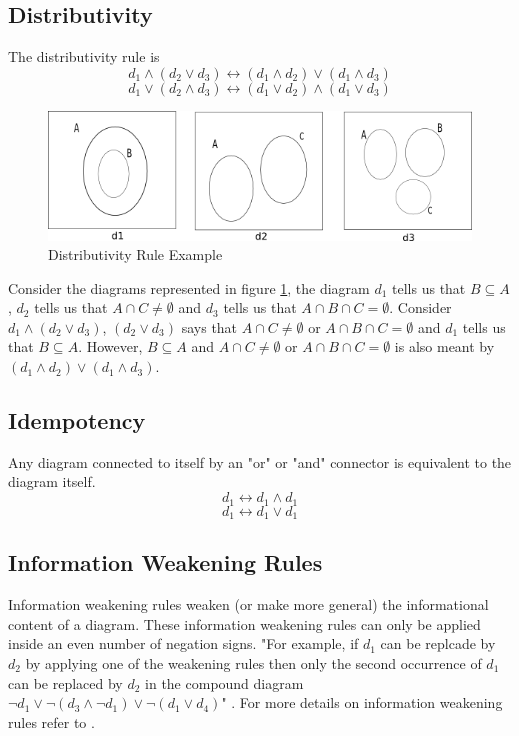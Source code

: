 \documentclass[10pt, a4paper, titlepage]{article}
\begin{document}
\subsection{Distributivity}
The distributivity rule is
$$ d_{1} \wedge (d_{2} \vee d_{3}) \longleftrightarrow (d_{1} \wedge d_{2}) \vee (d_{1} \wedge d_{3}) $$
$$ d_{1} \vee (d_{2} \wedge d_{3}) \longleftrightarrow (d_{1} \vee d_{2}) \wedge (d_{1} \vee d_{3}) $$


\begin{figure}[h]
\centering
\includegraphics[scale=0.7]{images/d9.png}
\caption{Distributivity Rule Example}
\label{d9}
\end{figure}

Consider the diagrams represented in figure \ref{d9}, the diagram $ d_{1} $ tells us that $ B \subseteq A $, $ d_{2} $ tells us that $ A \cap C \neq \emptyset $ and $ d_{3} $ tells us that $ A \cap B \cap C = \emptyset $. Consider $ d_{1} \wedge (d_{2} \vee d_{3}) $, $ (d_{2} \vee d_{3}) $ says that $ A \cap C \neq \emptyset $ or $ A \cap B \cap C = \emptyset $ and $ d_{1} $ tells us that $ B \subseteq A $. However, $ B \subseteq A $ and $ A \cap C \neq \emptyset $ or $ A \cap B \cap C = \emptyset $ is also meant by $ (d_{1} \wedge d_{2}) \vee (d_{1} \wedge d_{3}) $. 


\subsection{Idempotency}
Any diagram connected to itself by an "or" or "and" connector is equivalent to the diagram itself. 
$$ d_{1} \longleftrightarrow d_{1} \wedge d_{1} $$
$$ d_{1} \longleftrightarrow d_{1} \vee d_{1} $$

\subsection{Information Weakening Rules}
Information weakening rules weaken (or make more general) the informational content of a diagram. These information weakening rules can only be applied inside an even number of negation signs. "For example, if $ d_{1} $ can be replcade by $d_{2}$ by applying one of the weakening rules then only the second occurrence of $d_{1}$ can be replaced by $d_{2}$  in the compound diagram $ \neg d_{1} \vee \neg (d_{3} \wedge \neg d_{1}) \vee \neg(d_{1} \vee d_{4}) $" \cite{Gem_Judith}. For more details on information weakening rules refer to \cite{Gem_Judith}.
\end{document}
